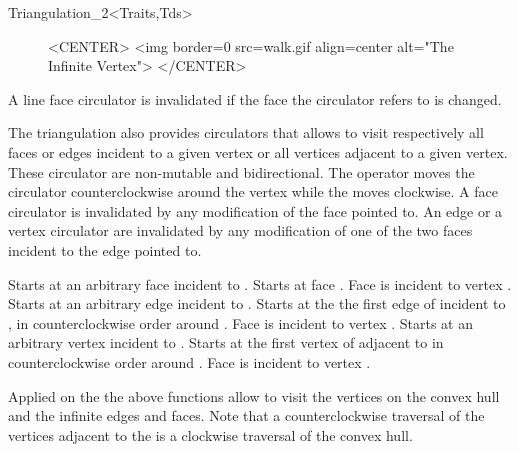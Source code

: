 \begin{ccClassTemplate}{Triangulation_2<Traits,Tds>}
\begin{figure}
\begin{ccHtmlOnly}
<CENTER>
<img border=0 src=walk.gif align=center alt="The Infinite Vertex">
</CENTER>
\end{ccHtmlOnly} 
\end{figure}

A line face circulator is invalidated if the face the circulator refers
to is changed.

\ccThreeToTwo




The triangulation also provides circulators that allows to visit 
respectively all faces or edges incident to a given vertex
or all vertices adjacent to a given vertex.
These circulator are
non-mutable
and bidirectional.
 The operator  moves the circulator
counterclockwise around the vertex while
the  moves clockwise.
A face circulator is invalidated by any modification of the face pointed to.
An edge or a vertex circulator are invalidated by any modification
of one of the two faces incident to the edge pointed to.

{Starts at an arbitrary face incident
to .}
\ccGlue
{}
{Starts at face .
\ccPrecond Face  is incident to vertex .}
\ccGlue
{}
{Starts at an arbitrary edge incident
to .}
\ccGlue
{}
{Starts at the the first edge of  incident to 
, in counterclockwise order around .
\ccPrecond Face  is incident to vertex .}
\ccGlue
{}
{Starts at an arbitrary  vertex incident
to .}
\ccGlue
{}
{Starts at the first vertex of  adjacent  to 
in  counterclockwise order around .
\ccPrecond Face  is incident to vertex .}





Applied on the 
the above  functions  allow to visit the vertices on the convex hull and
the infinite edges and faces. Note that a counterclockwise
traversal of the vertices adjacent to the  is
a clockwise traversal of the convex hull.


\end{ccClassTemplate}
